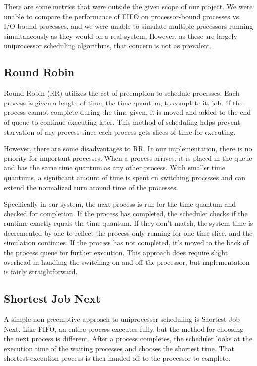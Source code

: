\documentclass[conference,11pt]{IEEEtran}
\begin{document}
There are some metrics that were outside the given scope of our project. We were unable to compare the performance of FIFO on processor-bound processes vs. I/O bound processes, and we were unable to simulate multiple processors running simultaneously as they would on a real system. However, as these are largely uniprocessor scheduling algorithms, that concern is not as prevalent.

\subsection{Round Robin}
Round Robin (RR) utilizes the act of preemption to schedule processes. Each process is given a length of time, the time quantum, to complete its job. If the process cannot complete during the time given, it is moved and added to the end of queue to continue executing later. This method of scheduling helps prevent starvation of any process since each process gets slices of time for executing.

However, there are some disadvantages to RR. In our implementation, there is no priority for important processes. When a process arrives, it is placed in the queue and has the same time quantum as any other process. With smaller time quantums, a significant amount of time is spent on switching processes and can extend the normalized turn around time of the processes.

Specifically in our system, the next process is run for the time quantum and checked for completion. If the process has completed, the scheduler checks if the runtime exactly equals the time quantum. If they don't match, the system time is decremented by one to reflect the process only running for one time slice, and the simulation continues. If the process has not completed, it's moved to the back of the process queue for further execution. This approach does require slight overhead in handling the switching on and off the processor, but implementation is fairly straightforward.

\subsection{Shortest Job Next}
A simple non preemptive approach to uniprocessor scheduling is Shortest Job Next. Like FIFO, an entire process executes fully, but the method for choosing the next process is different. After a process completes, the scheduler looks at the execution time of the waiting processes and chooses the shortest time. That shortest-execution process is then handed off to the processor to complete.
\end{document}
